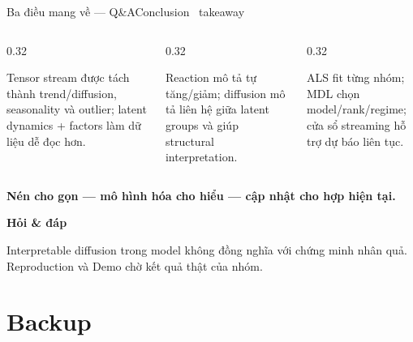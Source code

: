 \documentclass[aspectratio=169,11pt]{beamer}
\begin{document}
\begin{frame}[shrink=27]{Ba điều mang về --- Q\&A}{Conclusion \textperiodcentered\ takeaway}
\begin{columns}[T,onlytextwidth]
\begin{column}{0.32\textwidth}
\begin{intuition}
  Tensor stream được tách thành trend/diffusion, seasonality và outlier; latent dynamics + factors làm dữ liệu dễ đọc hơn.
\end{intuition}
\end{column}
\begin{column}{0.32\textwidth}
\begin{mathcard}
  Reaction mô tả tự tăng/giảm; diffusion mô tả liên hệ giữa latent groups và giúp structural interpretation.
\end{mathcard}
\end{column}
\begin{column}{0.32\textwidth}
\begin{takeaway}
  ALS fit từng nhóm; MDL chọn model/rank/regime; cửa sổ streaming hỗ trợ dự báo liên tục.
\end{takeaway}
\end{column}
\end{columns}
\vspace{7mm}
\centering
{\LARGE\bfseries\color{DTNavy}Nén cho gọn --- mô hình hóa cho hiểu --- cập nhật cho hợp hiện tại.}
\vspace{5mm}

{\Large\color{DTGold}\textbf{Hỏi \& đáp}}
\vspace{3mm}
\begin{caution}
  Interpretable diffusion trong model không đồng nghĩa với chứng minh nhân quả. Reproduction và Demo chờ kết quả thật của nhóm.
\end{caution}
\vspace{2mm}
\end{frame}

\appendix
\section{Backup}
\end{document}
